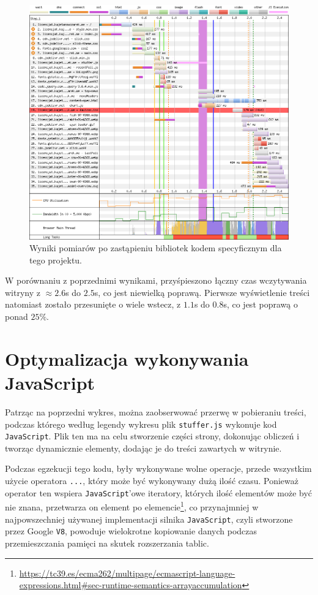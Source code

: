 \documentclass[licencjacka]{pracadypl}
\begin{document}
\begin{figure}[H]
  \centering
  \includegraphics[width=\linewidth]{images/waterfall-after-jsreduction.png}
  \caption{Wyniki pomiarów po zastąpieniu bibliotek kodem specyficznym dla tego projektu.}
  \label{fig:waterfall-after-jsreduction}
\end{figure}

W porównaniu z poprzednimi wynikami, przyśpieszono łączny czas wczytywania witryny z $\approx2.6$s do $2.5$s, co jest niewielką poprawą. Pierwsze wyświetlenie treści natomiast zostało przesunięte o wiele wstecz, z $1.1$s do $0.8$s, co jest poprawą o ponad $25\%$.

\section{Optymalizacja wykonywania JavaScript}

Patrząc na poprzedni wykres, można zaobserwować przerwę w pobieraniu treści, podczas którego według legendy wykresu plik \texttt{stuffer.js} wykonuje kod \texttt{JavaScript}. Plik ten ma na celu stworzenie części strony, dokonując obliczeń i tworząc dynamicznie elementy, dodając je do treści zawartych w witrynie.

Podczas egzekucji tego kodu, były wykonywane wolne operacje, przede wszystkim użycie operatora \texttt{...}, który może być wykonywany dużą ilość czasu. Ponieważ operator ten wspiera \texttt{JavaScript}'owe iteratory, których ilość elementów może być nie znana, przetwarza on element po elemencie\footnote{\url{https://tc39.es/ecma262/multipage/ecmascript-language-expressions.html\#sec-runtime-semantics-arrayaccumulation}}, co przynajmniej w najpowszechniej używanej implementacji silnika \texttt{JavaScript}, czyli stworzone przez Google \texttt{V8}, powoduje wielokrotne kopiowanie danych podczas przemieszczania pamięci na skutek rozszerzania tablic.
\end{document}
